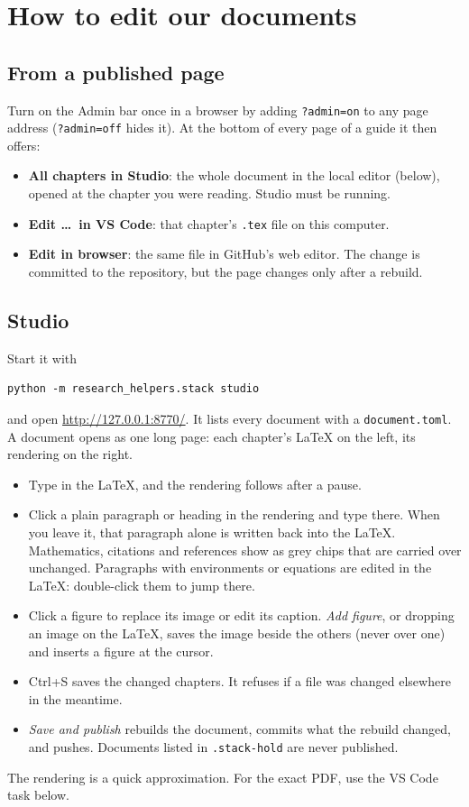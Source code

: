 \chapter{How to edit our documents}

\section{From a published page}

Turn on the Admin bar once in a browser by adding \texttt{?admin=on} to any page address (\texttt{?admin=off} hides it). At the bottom of every page of a guide it then offers:
\begin{itemize}
\item \textbf{All chapters in Studio}: the whole document in the local editor (below), opened at the chapter you were reading. Studio must be running.
\item \textbf{Edit \ldots\ in VS Code}: that chapter's \texttt{.tex} file on this computer.
\item \textbf{Edit in browser}: the same file in GitHub's web editor. The change is committed to the repository, but the page changes only after a rebuild.
\end{itemize}

\section{Studio}

Start it with
\begin{lstlisting}
python -m research_helpers.stack studio
\end{lstlisting}
and open \url{http://127.0.0.1:8770/}. It lists every document with a \texttt{document.toml}. A document opens as one long page: each chapter's LaTeX on the left, its rendering on the right.
\begin{itemize}
\item Type in the LaTeX, and the rendering follows after a pause.
\item Click a plain paragraph or heading in the rendering and type there. When you leave it, that paragraph alone is written back into the LaTeX. Mathematics, citations and references show as grey chips that are carried over unchanged. Paragraphs with environments or equations are edited in the LaTeX: double-click them to jump there.
\item Click a figure to replace its image or edit its caption. \emph{Add figure}, or dropping an image on the LaTeX, saves the image beside the others (never over one) and inserts a figure at the cursor.
\item Ctrl+S saves the changed chapters. It refuses if a file was changed elsewhere in the meantime.
\item \emph{Save and publish} rebuilds the document, commits what the rebuild changed, and pushes. Documents listed in \texttt{.stack-hold} are never published.
\end{itemize}
The rendering is a quick approximation. For the exact PDF, use the VS Code task below.

